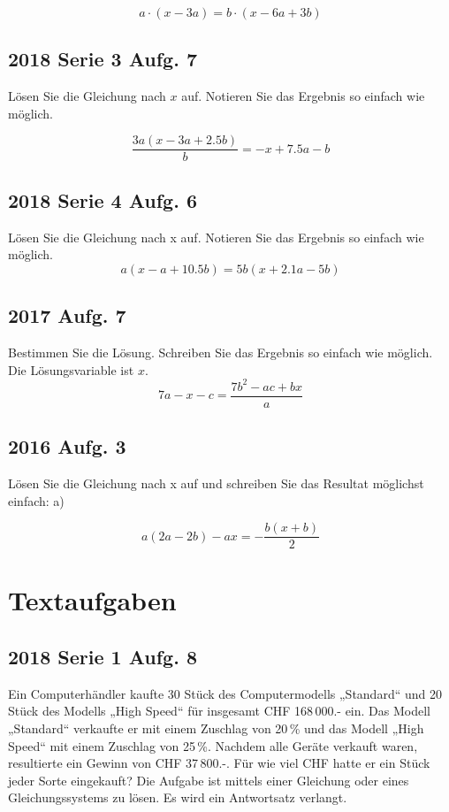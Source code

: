 $$a\cdot{} (x-3a) = b\cdot{} (x-6a+3b)$$

\subsection{2018 Serie 3 Aufg. 7}
Lösen Sie die Gleichung nach $x$ auf.
Notieren Sie das Ergebnis so einfach wie möglich.

$$\frac{3a (x-3a+2.5b)}{b}  =  -x + 7.5a -b$$

\subsection{2018 Serie 4 Aufg. 6}
Lösen Sie die Gleichung nach x auf.
Notieren Sie das Ergebnis so einfach wie möglich.
$$ a(x - a + 10.5b) = 5b( x + 2.1a - 5b)$$


\subsection{2017 Aufg. 7}
Bestimmen Sie die Lösung. Schreiben Sie das Ergebnis so einfach wie möglich.
Die Lösungsvariable ist $x$.
$$7a - x - c = \frac{7b^2 -ac + bx}{a}$$


\subsection{2016 Aufg. 3}

Lösen Sie die Gleichung nach x auf und schreiben Sie das Resultat möglichst einfach:
a)

$$a(2a-2b)  - ax = - \frac{b(x+b)}{2}$$


\section{Textaufgaben}

\subsection{2018 Serie 1 Aufg. 8}
Ein Computerhändler kaufte 30 Stück des Computermodells „Standard“ und
20 Stück des Modells „High Speed“ für insgesamt CHF 168\,000.- ein.
Das Modell „Standard“ verkaufte er mit einem Zuschlag von 20\,\% und das
Modell „High Speed“ mit einem Zuschlag von 25\,\%. Nachdem alle Geräte
verkauft waren, resultierte ein Gewinn von CHF 37\,800.-.
Für wie viel CHF hatte er ein Stück jeder Sorte eingekauft?
Die Aufgabe ist mittels einer Gleichung oder eines Gleichungssystems zu lösen.
Es wird ein Antwortsatz verlangt.


